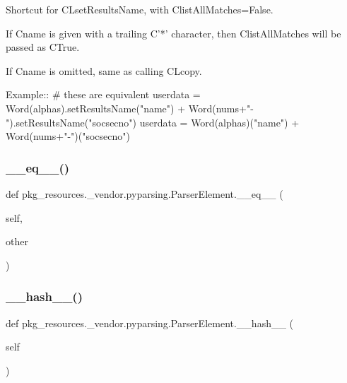 \begin{DoxyVerb}Shortcut for C{L{setResultsName}}, with C{listAllMatches=False}.

If C{name} is given with a trailing C{'*'} character, then C{listAllMatches} will be
passed as C{True}.
   
If C{name} is omitted, same as calling C{L{copy}}.

Example::
    # these are equivalent
    userdata = Word(alphas).setResultsName("name") + Word(nums+"-").setResultsName("socsecno")
    userdata = Word(alphas)("name") + Word(nums+"-")("socsecno")             
\end{DoxyVerb}
 \mbox{\label{classpkg__resources_1_1__vendor_1_1pyparsing_1_1ParserElement_a20b56b3e2a3a8da2918a9288e55c3370}} 
\subsubsection{\texorpdfstring{\+\_\+\+\_\+eq\+\_\+\+\_\+()}{\_\_eq\_\_()}}
{\footnotesize\ttfamily def pkg\+\_\+resources.\+\_\+vendor.\+pyparsing.\+Parser\+Element.\+\_\+\+\_\+eq\+\_\+\+\_\+ (\begin{DoxyParamCaption}\item[{}]{self,  }\item[{}]{other }\end{DoxyParamCaption})}

\mbox{\label{classpkg__resources_1_1__vendor_1_1pyparsing_1_1ParserElement_af223861097e3eb4e809bd350e5292f0c}} 
\subsubsection{\texorpdfstring{\+\_\+\+\_\+hash\+\_\+\+\_\+()}{\_\_hash\_\_()}}
{\footnotesize\ttfamily def pkg\+\_\+resources.\+\_\+vendor.\+pyparsing.\+Parser\+Element.\+\_\+\+\_\+hash\+\_\+\+\_\+ (\begin{DoxyParamCaption}\item[{}]{self }\end{DoxyParamCaption})}

